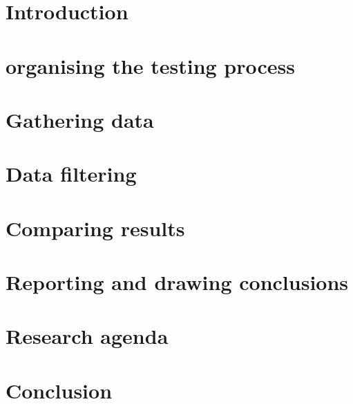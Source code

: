 \documentclass[oneside]{book}
\begin{document}
\clearpage %
\tableofcontents

\clearpage %
\listoffigures


\mainmatter

\chapter{Introduction}
\label{chapter:indroduction}


\chapter{organising the testing process}
\label{chapter:organising}


\chapter{Gathering data}
\label{chapter:gathering}


\chapter{Data filtering}
\label{chapter:filtering}


\chapter{Comparing results}
\label{chapter:comparing}


\chapter{Reporting and drawing conclusions}
\label{chapter:reporting}


\chapter{Research agenda}
\label{chapter:agenda}


\newpage

\chapter{Conclusion}
\label{chapter:agenda}




\backmatter

{}



\end{document}
